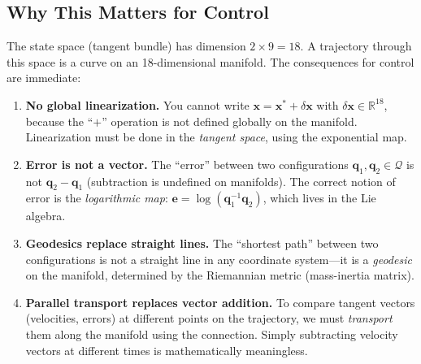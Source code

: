 \documentclass[12pt, openany]{book}
\theoremstyle{plain}
\newcommand{\state}{\bm{x}}
\newcommand{\configspace}{\mathcal{Q}}
\newcommand{\Reals}{\mathbb{R}}
\begin{document}
\subsection{Why This Matters for Control}

The state space (tangent bundle) has dimension $2 \times 9 = 18$. A trajectory
through this space is a curve on an 18-dimensional manifold. The consequences
for control are immediate:

\begin{enumerate}[label=\textbf{C\arabic*.}, leftmargin=1.5cm]
  \item \textbf{No global linearization.} You cannot write
    $\state = \state^* + \delta\state$ with $\delta\state \in \Reals^{18}$,
    because the ``$+$'' operation is not defined globally on the manifold.
    Linearization must be done in the \emph{tangent space}, using the
    exponential map.

  \item \textbf{Error is not a vector.} The ``error'' between two configurations
    $\bm{q}_1, \bm{q}_2 \in \configspace$ is not $\bm{q}_2 - \bm{q}_1$
    (subtraction is undefined on manifolds). The correct notion of error
    is the \emph{logarithmic map}: $\bm{e} = \log(\bm{q}_1^{-1} \bm{q}_2)$,
    which lives in the Lie algebra.

  \item \textbf{Geodesics replace straight lines.} The ``shortest path'' between
    two configurations is not a straight line in any coordinate system---it
    is a \emph{geodesic} on the manifold, determined by the Riemannian metric
    (mass-inertia matrix).

  \item \textbf{Parallel transport replaces vector addition.} To compare
    tangent vectors (velocities, errors) at different points on the trajectory,
    we must \emph{transport} them along the manifold using the connection.
    Simply subtracting velocity vectors at different times is mathematically
    meaningless.
\end{enumerate}
\end{document}
